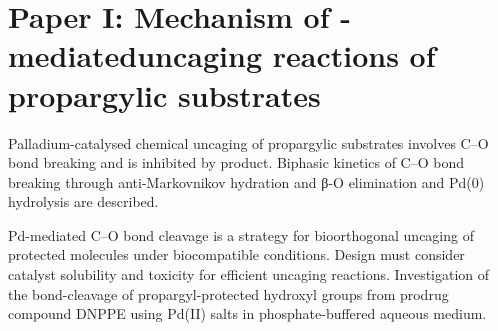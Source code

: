 \chapter{Paper I:\@
  Mechanism of -mediated\linebreak uncaging reactions %
  of propargylic substrates
 }%
\label{ch:paper1}


Palladium-catalysed chemical uncaging of propargylic substrates involves C–O bond breaking and is inhibited by product.
Biphasic kinetics of C–O bond breaking through anti-Markovnikov hydration and β-O elimination and Pd(0) hydrolysis are described.

Pd-mediated C–O bond cleavage is a strategy for bioorthogonal uncaging of protected molecules under biocompatible conditions.
Design must consider catalyst solubility and toxicity for efficient uncaging reactions.
Investigation of the bond-cleavage of propargyl-protected hydroxyl groups from prodrug compound DNPPE using Pd(II) salts in phosphate-buffered aqueous medium.

